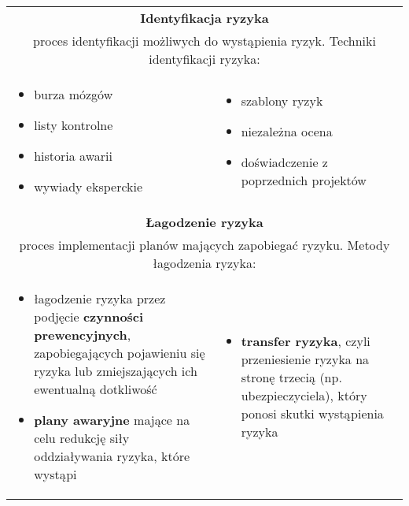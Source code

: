 \documentclass[../main.tex]{subfiles}
\begin{document}
    \begin{table}[H]
        \begin{center}
            \begin{tabular}{| p{8cm}  p{8cm} |}
                \hline
                \multicolumn{2}{|c|}{\textbf{Identyfikacja ryzyka}}\\
                \multicolumn{2}{|c|}{proces identyfikacji możliwych do wystąpienia ryzyk. Techniki identyfikacji
                ryzyka:}\\
                \hline
                \begin{itemize}
                    \item burza mózgów
                    \item listy kontrolne
                    \item historia awarii
                    \item wywiady eksperckie
                \end{itemize}
                &
                \begin{itemize}
                    \item szablony ryzyk
                    \item niezależna ocena
                    \item doświadczenie z poprzednich projektów
                \end{itemize}\\
                \hline
                \hline
                \multicolumn{2}{|c|}{\textbf{Łagodzenie ryzyka}}\\
                \multicolumn{2}{|c|}{proces implementacji planów mających zapobiegać ryzyku. Metody łagodzenia ryzyka:}\\
                \hline
                \begin{itemize}
                    \item łagodzenie ryzyka przez podjęcie \textbf{czynności prewencyjnych}, zapobiegających pojawieniu się ryzyka lub zmiejszających ich ewentualną dotkliwość
                    \item \textbf{plany awaryjne} mające na celu redukcję siły oddziaływania ryzyka, które wystąpi
                \end{itemize}
                &
                \begin{itemize}
                    \item \textbf{transfer ryzyka}, czyli przeniesienie ryzyka na stronę trzecią (np. ubezpieczyciela), który ponosi skutki wystąpienia ryzyka

\end{itemize}
\end{tabular}
\end{center}
\end{table}
\end{document}
